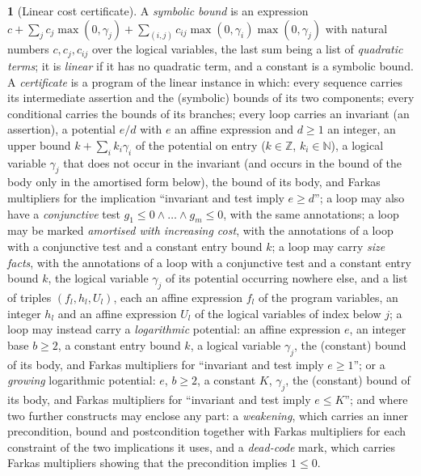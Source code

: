 \documentclass[oneside,english]{amsart}
\numberwithin{equation}{section}
\numberwithin{figure}{section}
\theoremstyle{plain}
\theoremstyle{definition}
\newtheorem{defn}[thm]{\protect\definitionname}
\theoremstyle{plain}
\theoremstyle{remark}
\theoremstyle{plain}
\theoremstyle{definition}
\theoremstyle{plain}
\theoremstyle{remark}
\providecommand{\definitionname}{Definition}
\begin{document}
\begin{defn}[Linear cost certificate]
\label{def:certificate}
A \emph{symbolic bound} is an expression $c + \sum_j c_j \max(0, \gamma_j) + \sum_{(i,j)} c_{ij} \max(0, \gamma_i) \max(0, \gamma_j)$ with natural numbers $c, c_j, c_{ij}$ over the logical variables, the last sum being a list of \emph{quadratic terms}; it is \emph{linear} if it has no quadratic term, and a constant is a symbolic bound. A \emph{certificate} is a program of the linear instance in which: every sequence carries its intermediate assertion and the (symbolic) bounds of its two components; every conditional carries the bounds of its branches; every loop carries an invariant (an assertion), a potential $e/d$ with $e$ an affine expression and $d \ge 1$ an integer, an upper bound $k + \sum_i k_i \gamma_i$ of the potential on entry ($k \in \mathbb{Z}$, $k_i \in \mathbb{N}$), a logical variable $\gamma_j$ that does not occur in the invariant (and occurs in the bound of the body only in the amortised form below), the bound of its body, and Farkas multipliers for the implication ``invariant and test imply $e \ge d$''; a loop may also have a \emph{conjunctive} test $g_1 \le 0 \wedge \dots \wedge g_m \le 0$, with the same annotations; a loop may be marked \emph{amortised with increasing cost}, with the annotations of a loop with a conjunctive test and a constant entry bound $k$; a loop may carry \emph{size facts}, with the annotations of a loop with a conjunctive test and a constant entry bound $k$, the logical variable $\gamma_j$ of its potential occurring nowhere else, and a list of triples $(f_l, h_l, U_l)$, each an affine expression $f_l$ of the program variables, an integer $h_l$ and an affine expression $U_l$ of the logical variables of index below $j$; a loop may instead carry a \emph{logarithmic} potential: an affine expression $e$, an integer base $b \ge 2$, a constant entry bound $k$, a logical variable $\gamma_j$, the (constant) bound of its body, and Farkas multipliers for ``invariant and test imply $e \ge 1$''; or a \emph{growing} logarithmic potential: $e$, $b \ge 2$, a constant $K$, $\gamma_j$, the (constant) bound of its body, and Farkas multipliers for ``invariant and test imply $e \le K$''; and where two further constructs may enclose any part: a \emph{weakening}, which carries an inner precondition, bound and postcondition together with Farkas multipliers for each constraint of the two implications it uses, and a \emph{dead-code} mark, which carries Farkas multipliers showing that the precondition implies $1 \le 0$.
\end{defn}
\end{document}

